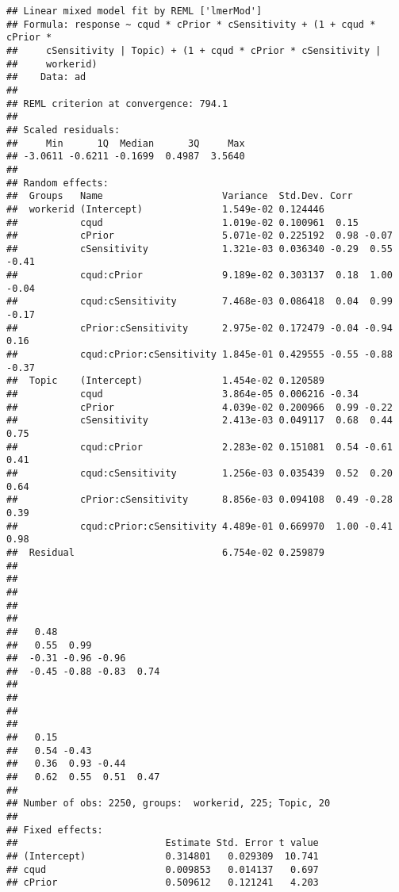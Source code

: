 \documentclass[]{article}
\begin{document}
\begin{verbatim}
## Linear mixed model fit by REML ['lmerMod']
## Formula: response ~ cqud * cPrior * cSensitivity + (1 + cqud * cPrior *  
##     cSensitivity | Topic) + (1 + cqud * cPrior * cSensitivity |  
##     workerid)
##    Data: ad
## 
## REML criterion at convergence: 794.1
## 
## Scaled residuals: 
##     Min      1Q  Median      3Q     Max 
## -3.0611 -0.6211 -0.1699  0.4987  3.5640 
## 
## Random effects:
##  Groups   Name                     Variance  Std.Dev. Corr             
##  workerid (Intercept)              1.549e-02 0.124446                  
##           cqud                     1.019e-02 0.100961  0.15            
##           cPrior                   5.071e-02 0.225192  0.98 -0.07      
##           cSensitivity             1.321e-03 0.036340 -0.29  0.55 -0.41
##           cqud:cPrior              9.189e-02 0.303137  0.18  1.00 -0.04
##           cqud:cSensitivity        7.468e-03 0.086418  0.04  0.99 -0.17
##           cPrior:cSensitivity      2.975e-02 0.172479 -0.04 -0.94  0.16
##           cqud:cPrior:cSensitivity 1.845e-01 0.429555 -0.55 -0.88 -0.37
##  Topic    (Intercept)              1.454e-02 0.120589                  
##           cqud                     3.864e-05 0.006216 -0.34            
##           cPrior                   4.039e-02 0.200966  0.99 -0.22      
##           cSensitivity             2.413e-03 0.049117  0.68  0.44  0.75
##           cqud:cPrior              2.283e-02 0.151081  0.54 -0.61  0.41
##           cqud:cSensitivity        1.256e-03 0.035439  0.52  0.20  0.64
##           cPrior:cSensitivity      8.856e-03 0.094108  0.49 -0.28  0.39
##           cqud:cPrior:cSensitivity 4.489e-01 0.669970  1.00 -0.41  0.98
##  Residual                          6.754e-02 0.259879                  
##                         
##                         
##                         
##                         
##                         
##   0.48                  
##   0.55  0.99            
##  -0.31 -0.96 -0.96      
##  -0.45 -0.88 -0.83  0.74
##                         
##                         
##                         
##                         
##   0.15                  
##   0.54 -0.43            
##   0.36  0.93 -0.44      
##   0.62  0.55  0.51  0.47
##                         
## Number of obs: 2250, groups:  workerid, 225; Topic, 20
## 
## Fixed effects:
##                          Estimate Std. Error t value
## (Intercept)              0.314801   0.029309  10.741
## cqud                     0.009853   0.014137   0.697
## cPrior                   0.509612   0.121241   4.203

\end{verbatim}
\end{document}
